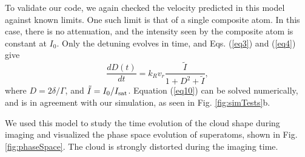 \documentclass[12pt]{iopart}
\begin{document}
\par To validate our code, we again checked the velocity predicted in this model against known limits. One such limit is that of a single composite atom. In this case, there is no attenuation, and the intensity seen by the composite atom is constant at $I_0$. Only the detuning  evolves in time, and Eqs. (\ref{eq3}) and (\ref{eq4}) give
\begin{equation}
\frac{dD(t)}{dt}= k_R v_r \frac{\tilde{I}}{1+D^2+\tilde{I}},
\label{eq10}
\end{equation}
where $D = 2\delta/\Gamma$, and $\tilde{I} = I_0/I_{\rm{sat}}$. Equation (\ref{eq10}) can be solved numerically, and is in agreement with our simulation, as seen in Fig. \ref{fig:simTests}b.
\par We used this model to study the time evolution of the cloud shape during imaging and visualized the phase space evolution of superatoms, shown in Fig. \ref{fig:phaseSpace}. The cloud is strongly distorted during the imaging time. 
\end{document}
